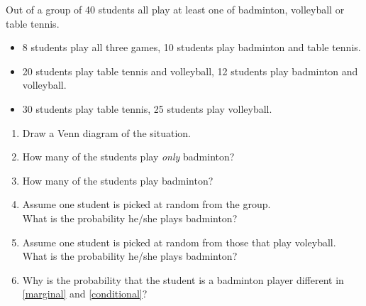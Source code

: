 \item
  Out of a group of 40 students all play at least one of badminton, volleyball or table tennis.
  \begin{itemize}
    \item 8 students play all three games, 10 students play badminton and table tennis.
    \item 20 students play table tennis and volleyball, 12 students play badminton and volleyball.
    \item 30 students play table tennis, 25 students play volleyball.
  \end{itemize}
  \begin{enumerate}
    \item
      Draw a Venn diagram of the situation.
    \item
      How many of the students play \emph{only} badminton?
    \item
      How many of the students play badminton?
    \item \label{marginal}
      Assume one student is picked at random from the group.\\
      What is the probability he/she plays badminton?
    \item \label{conditional}
      Assume one student is picked at random from those that play voleyball.\\
      What is the probability he/she plays badminton?
    \item
      Why is the probability that the student is a badminton player different in \ref{marginal} and \ref{conditional}?
  \end{enumerate}

